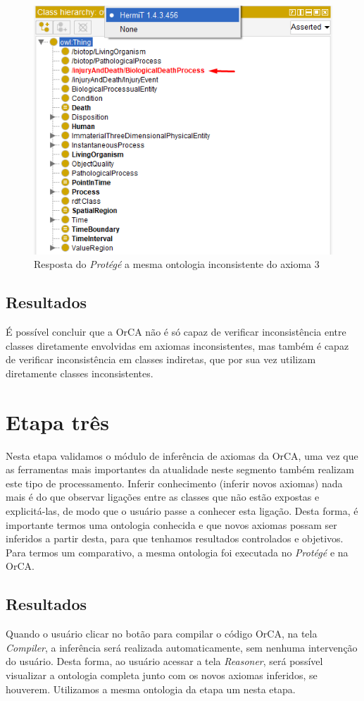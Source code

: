 \documentclass{bcc}
\begin{document}
\begin{figure}[H]
\centering
\includegraphics[width=.5\textwidth]{Figuras/axiomai_3_protege.png}
\caption{Resposta do \textit{Protégé} a mesma ontologia inconsistente do axioma 3} 
\label{fig:axiomai_3_protege}
\end{figure}

\subsection{Resultados}
É possível concluir que a OrCA não é só capaz de verificar inconsistência entre classes diretamente envolvidas em axiomas inconsistentes, mas também é capaz de verificar inconsistência em classes indiretas, que por sua vez utilizam diretamente classes inconsistentes.

\section{Etapa três}
Nesta etapa validamos o módulo de inferência de axiomas da OrCA, uma vez que as ferramentas mais importantes da atualidade neste segmento também realizam este tipo de processamento. Inferir conhecimento (inferir novos axiomas) nada mais é do que observar ligações entre as classes que não estão expostas e explicitá-las, de modo que o usuário passe a conhecer esta ligação. Desta forma, é importante termos uma ontologia conhecida e que novos axiomas possam ser inferidos a partir desta, para que tenhamos resultados controlados e objetivos. Para termos um comparativo, a mesma ontologia foi executada no \textit{Protégé} e na OrCA.

\subsection{Resultados}
Quando o usuário clicar no botão para compilar o código OrCA, na tela \textit{Compiler}, a inferência será realizada automaticamente, sem nenhuma intervenção do usuário. Desta forma, ao usuário acessar a tela \textit{Reasoner}, será possível visualizar a ontologia completa junto com os novos axiomas inferidos, se houverem. Utilizamos a mesma ontologia da etapa um nesta etapa.
\end{document}
